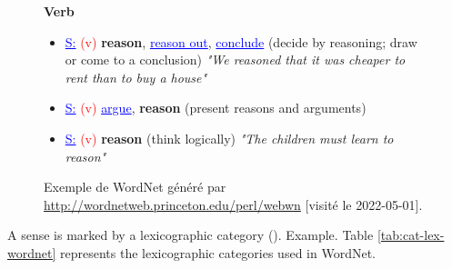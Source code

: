 \documentclass{KBook}
\begin{document}
\begin{figure}[ht]
\begin{tcolorbox}[colback=white, colframe=blue, boxrule=1pt, text width=.90\textwidth]
			{\normalsize\bfseries Verb}
			\begin{itemize}[label=$\bullet$]
				\item \textcolor{blue}{\underline{S:}} \textcolor{red}{(v)} \textbf{reason}, \textcolor{blue}{\underline{reason out}}, \textcolor{blue}{\underline{conclude}} (decide by reasoning; draw or come to a conclusion) \textit{"We reasoned that it was cheaper to rent than to buy a house"}
				\item \textcolor{blue}{\underline{S:}} \textcolor{red}{(v)} \textcolor{blue}{\underline{argue}}, \textbf{reason} (present reasons and arguments)
				\item \textcolor{blue}{\underline{S:}} \textcolor{red}{(v)} \textbf{reason} (think logically) \textit{"The children must learn to reason"}
			\end{itemize}
	\end{tcolorbox}
	\caption[Exemple de WordNet.]{Exemple de WordNet généré par \url{http://wordnetweb.princeton.edu/perl/webwn} [visité le 2022-05-01].}
	\label{fig:wordnet-exp}
\end{figure}


A sense is marked by a lexicographic category (). 
Example. 
Table \ref{tab:cat-lex-wordnet} represents the lexicographic categories used in WordNet.
\end{document}
